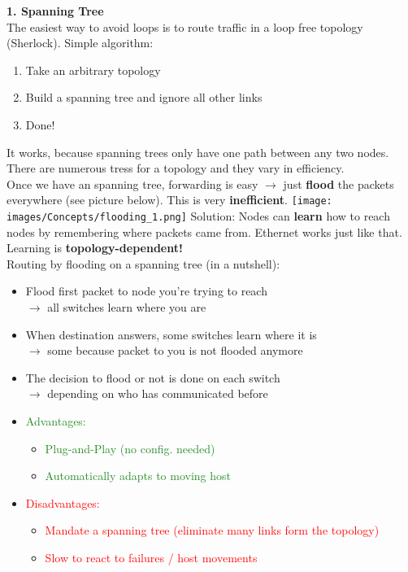 \documentclass[a4paper, fontsize=8pt, landscape, DIV=1]{scrartcl}
\begin{document}
\begin{multicols*}{4}
		\textbf{1. Spanning Tree}\\
		The easiest way to avoid loops is to route traffic in a loop free topology
		(Sherlock). Simple algorithm: 
		\begin{enumerate}[noitemsep]
			\item Take an arbitrary topology
			\item Build a spanning tree and ignore all other links
			\item Done!
		\end{enumerate}
		It works, because spanning trees only have one path between any two nodes.
		There are numerous tress for a topology and they vary in efficiency. \\
		Once we have an spanning tree, forwarding is easy $\rightarrow$ just
		\textbf{flood} the packets everywhere (see picture below). This is very
		\textbf{inefficient}. 
		\texttt{[image: images/Concepts/flooding\_1.png]}
		Solution: Nodes can \textbf{learn} how to reach nodes by remembering where
		packets came from. Ethernet works just like that. Learning is
		\textbf{topology-dependent!}\\
		Routing by flooding on a spanning tree (in a nutshell):
		\begin{itemize}[noitemsep]
			\item Flood first packet to node you're trying to reach\\ $\rightarrow$ all
			switches learn where you are
			\item When destination answers, some switches learn where it is\\
			$\rightarrow$ some because packet to you is not flooded anymore
			\item The decision to flood or not is done on each switch\\ $\rightarrow$
			depending on who has communicated before 
		\end{itemize}
		\begin{itemize}[noitemsep]
			\item \textcolor{ForestGreen}{Advantages:}
			\begin{itemize}
				\item \textcolor{ForestGreen}{Plug-and-Play (no config. needed)} 
				\item \textcolor{ForestGreen}{Automatically adapts to moving host}
			\end{itemize}
			\item \textcolor{red}{Disadvantages:}
			\begin{itemize}
				\item \textcolor{red}{Mandate a spanning tree (eliminate many links form
					the topology)}
				\item \textcolor{red}{Slow to react to failures / host movements}
			\end{itemize} 
		\end{itemize}
		

\end{multicols*}
\end{document}

